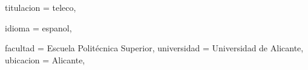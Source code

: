 {  %
  titulacion = teleco,
  
  idioma = espanol,
  
  
  facultad = {Escuela Politécnica Superior},
  universidad = {Universidad de Alicante},
  ubicacion = {Alicante},
  
}
